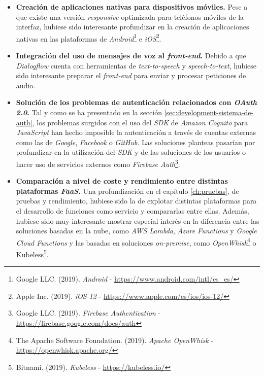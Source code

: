 \documentclass[11pt,spanish,listoffigures]{tfgetsinf}
\begin{document}
\begin{itemize}

\item \textbf{Creación de aplicaciones nativas para dispositivos móviles.} Pese a que existe una versión \textit{responsive} optimizada para teléfonos móviles de la interfaz, hubiese sido interesante profundizar en la creación de aplicaciones nativas en las plataformas de \textit{Android}\footnote{Google LLC. (2019). \textit{Android} - \url{https://www.android.com/intl/es_es/}} e \textit{iOS}\footnote{Apple Inc. (2019). \textit{iOS 12} - \url{https://www.apple.com/es/ios/ios-12/}}.

\item \textbf{Integración del uso de mensajes de voz al \textit{front-end}.} Debido a que \textit{Dialogflow} cuenta con herramientas de \textit{text-to-speech} y \textit{speech-to-text}, hubiese sido interesante preparar el \textit{front-end} para enviar y procesar peticiones de audio.

\item \textbf{Solución de los problemas de autenticación relacionados con \textit{OAuth 2.0}.} Tal y como se ha presentado en la sección \ref{sec:development-sistema-de-auth}, los problemas surgidos con el uso del \textit{SDK} de \textit{Amazon Cognito} para \textit{JavaScript} han hecho imposible la autenticación a través de cuentas externas como las de \textit{Google}, \textit{Facebook} o \textit{GitHub}. Las soluciones planteas pasarían por profundizar en la utilización del \textit{SDK} y de las soluciones de los usuarios o hacer uso de servicios externos como \textit{Firebase Auth}\footnote{Google LLC. (2019). \textit{Firebase Authentication} - \url{https://firebase.google.com/docs/auth}}.

\item \textbf{Comparación a nivel de coste y rendimiento entre distintas plataformas \textit{FaaS}.} Una profundización en el capítulo \ref{ch:pruebas}, de pruebas y rendimiento, hubiese sido la de explotar distintas plataformas para el desarrollo de funciones como servicio y compararlas entre ellas. Además, hubiese sido muy interesante mostrar especial interés en la diferencia entre las soluciones basadas en la nube, como \textit{AWS Lambda}, \textit{Azure Functions} y \textit{Google Cloud Functions} y las basadas en soluciones \textit{on-premise}, como \textit{OpenWhisk}\footnote{The Apache Software Foundation. (2019). \textit{Apache OpenWhisk} - \url{https://openwhisk.apache.org/}} o Kubeless\footnote{Bitnami. (2019). \textit{Kubeless} - \url{https://kubeless.io/}}.


\end{itemize}
\end{document}
